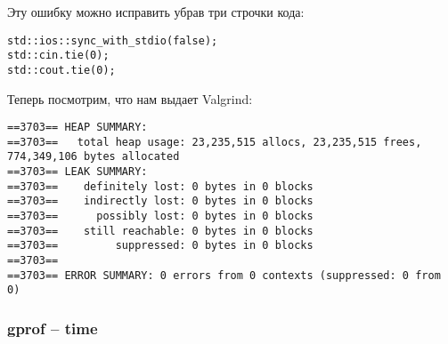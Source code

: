 \documentclass[12pt]{article}
\begin{document}
Эту ошибку можно исправить убрав три строчки кода:

\begin{lstlisting}
std::ios::sync_with_stdio(false);
std::cin.tie(0);
std::cout.tie(0); 
\end{lstlisting}

Теперь посмотрим, что нам выдает Valgrind:
\begin{lstlisting}
==3703== HEAP SUMMARY:
==3703==   total heap usage: 23,235,515 allocs, 23,235,515 frees, 774,349,106 bytes allocated
==3703== LEAK SUMMARY:
==3703==    definitely lost: 0 bytes in 0 blocks
==3703==    indirectly lost: 0 bytes in 0 blocks
==3703==      possibly lost: 0 bytes in 0 blocks
==3703==    still reachable: 0 bytes in 0 blocks
==3703==         suppressed: 0 bytes in 0 blocks
==3703== 
==3703== ERROR SUMMARY: 0 errors from 0 contexts (suppressed: 0 from 0)
\end{lstlisting}

\subsubsection{gprof -- time}
\end{document}
